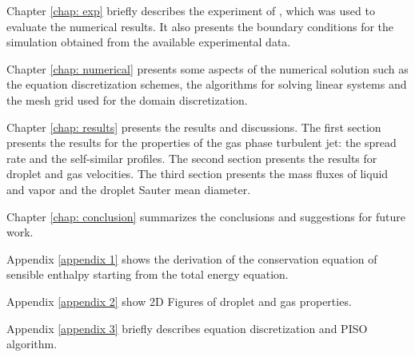 Chapter \ref{chap: exp} briefly describes the experiment of \cite{chen}, which was used to evaluate the numerical results. It also presents the boundary conditions for the simulation obtained from the available experimental data.

Chapter \ref{chap: numerical} presents some aspects of the numerical solution such as the equation discretization schemes, the algorithms for solving linear systems and the mesh grid used for the domain discretization.

Chapter \ref{chap: results} presents the results and discussions. The first section presents the results for the properties of the gas phase turbulent jet: the spread rate and the self-similar profiles. The second section presents the results for droplet and gas velocities. The third section presents the mass fluxes of liquid and vapor and the droplet Sauter mean diameter.

Chapter \ref{chap: conclusion} summarizes the conclusions and suggestions for future work.

Appendix \ref{appendix 1} shows the derivation of the conservation equation of sensible enthalpy starting from the total energy equation.

Appendix \ref{appendix 2} show 2D Figures of droplet and gas properties.

Appendix \ref{appendix 3} briefly describes equation discretization and PISO algorithm.
